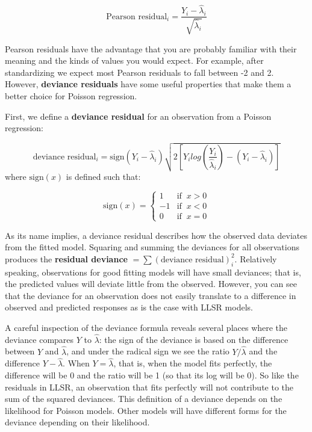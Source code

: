 \documentclass[
]{krantz}
\begin{document}
\begin{equation*}
\textrm{Pearson residual}_i = \frac{Y_i-\hat{\lambda}_i}{\sqrt{\hat{\lambda}_i}}
\end{equation*}

Pearson residuals have the advantage that you are probably familiar with their meaning and the kinds of values you would expect. For example, after standardizing we expect most Pearson residuals to fall between -2 and 2. However, \textbf{deviance residuals}  have some useful properties that make them a better choice for Poisson regression.

First, we define a \textbf{deviance residual} for an observation from a Poisson regression:

\begin{equation*}
\textrm{deviance residual}_i = \textrm{sign}(Y_i-\hat{\lambda}_i)
\sqrt{
2 \left[Y_i log\left(\frac{Y_i}{\hat{\lambda}_i}\right)
-(Y_i - \hat{\lambda}_i) \right]}
\end{equation*}
where \(\textrm{sign}(x)\) is defined such that:

\[ \textrm{sign}(x) = \begin{cases} 1  & \textrm{if }\ x > 0 \\
                                    -1 & \textrm{if }\ x < 0  \\
                                    0  & \textrm{if }\ x = 0\end{cases}\]

As its name implies, a deviance residual describes how the observed data deviates from the fitted model. Squaring and summing the deviances for all observations produces the \textbf{residual deviance} \(=\sum (\textrm{deviance residual})^2_i\).  Relatively speaking, observations for good fitting models will have small deviances; that is, the predicted values will deviate little from the observed. However, you can see that the deviance for an observation does not easily translate to a difference in observed and predicted responses as is the case with LLSR models.

A careful inspection of the deviance formula reveals several places where the deviance compares \(Y\) to \(\hat{\lambda}\): the sign of the deviance is based on the difference between \(Y\) and \(\hat{\lambda}\), and under the radical sign we see the ratio \(Y/\hat{\lambda}\) and the difference \(Y -\hat{\lambda}\). When \(Y = \hat{\lambda}\), that is, when the model fits perfectly, the difference will be 0 and the ratio will be 1 (so that its log will be 0). So like the residuals in LLSR, an observation that fits perfectly will not contribute to the sum of the squared deviances. This definition of a deviance depends on the likelihood for Poisson models. Other models will have different forms for the deviance depending on their likelihood.
\end{document}
